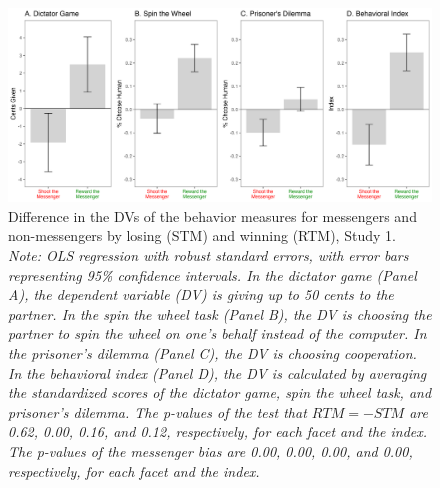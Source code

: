 \renewcommand{\baselinestretch}{1.25}%
\begin{figure}[!t]%
  \centering
  \includegraphics[width=1.0\textwidth]{figures/study1_behavior_list.png}
  \caption{Difference in the DVs of the behavior measures for messengers and non-messengers 
                                              by losing (STM) and winning (RTM), Study 1. 
  \textit{Note: OLS regression with robust standard errors, with error bars representing 95\% confidence intervals. In the dictator game (Panel A), the dependent variable (DV) is giving up to 50 cents to the partner. 
                 In the spin the wheel task (Panel B), the DV is choosing the partner to spin the wheel on one’s behalf instead of the computer. 
                 In the prisoner’s dilemma (Panel C), the DV is choosing cooperation. 
                 In the behavioral index (Panel D), the DV is calculated by averaging the standardized scores of the dictator game, spin the wheel task, and prisoner's dilemma. The p-values of the test that $RTM = -STM$ are 0.62, 0.00, 0.16, and 0.12, respectively, for each facet and the index. The p-values of the messenger bias are 0.00, 0.00, 0.00, and 0.00, respectively, for each facet and the index.}}
  \label{fig:behavior_list}
\end{figure}%
\renewcommand{\baselinestretch}{1.67}%
